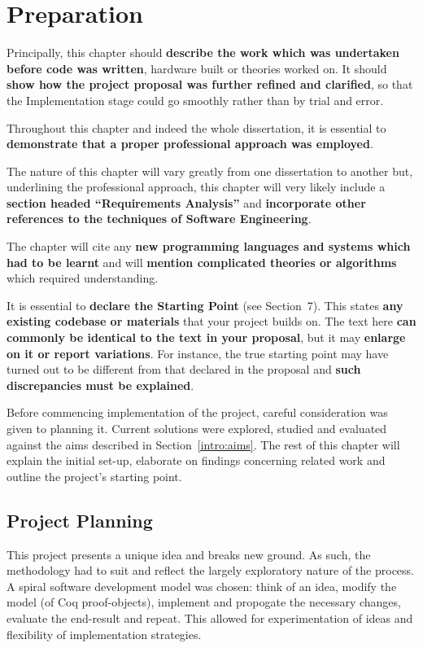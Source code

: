 \chapter{Preparation}

{\sf \color{red}
  Principally, this chapter should \textbf{describe the work which was
  undertaken before code was written}, hardware built or theories worked on. It
  should \textbf{show how the project proposal was further refined and
  clarified}, so that the Implementation stage could go smoothly rather than by
  trial and error.

  Throughout this chapter and indeed the whole dissertation, it is essential to
  \textbf{demonstrate that a proper professional approach was employed}.

  The nature of this chapter will vary greatly from one dissertation to another
  but, underlining the professional approach, this chapter will very likely
  include a \textbf{section headed “Requirements Analysis”} and
  \textbf{incorporate other references to the techniques of Software
  Engineering}.

  The chapter will cite any \textbf{new programming languages and systems which
  had to be learnt} and will \textbf{mention complicated theories or
algorithms} which required understanding.

  It is essential to \textbf{declare the Starting Point} (see Section 7). This
  states \textbf{any existing codebase or materials} that your project builds
  on.  The text here \textbf{can commonly be identical to the text in your
  proposal}, but it may \textbf{enlarge on it or report variations}. For
  instance, the true starting point may have turned out to be different from
  that declared in the proposal and \textbf{such discrepancies must be
  explained}.
}

Before commencing implementation of the project, careful consideration was
given to planning it. Current solutions were explored, studied and evaluated
against the aims described in Section~\ref{intro:aims}. The rest of this
chapter will explain the initial set-up, elaborate on findings concerning
related work and outline the project's starting point.

\section{Project Planning}

This project presents a unique idea and breaks new ground. As such, the
methodology had to suit and reflect the largely exploratory nature of the
process. A spiral software development model was chosen: think of an idea,
modify the model (of Coq proof-objects), implement and propogate the necessary
changes, evaluate the end-result and repeat. This allowed for experimentation
of ideas and flexibility of implementation strategies.

